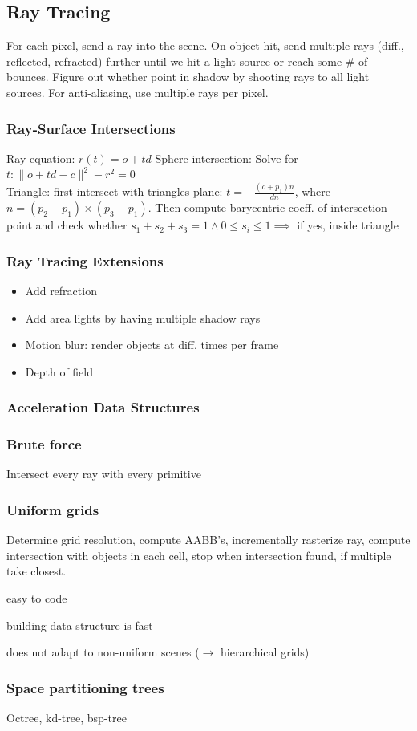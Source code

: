 \documentclass[a4paper,10pt]{article}
\let\svitem\item
\newenvironment{citemize}[1][\relax]{\renewcommand\item[1][black]{\color{##1}\svitem}
  \ifx\relax#1\itemize\else\itemize[#1]\fi}{\enditemize}
\newcommand*\good{\item[goodgreen]}
\newcommand*\bad{\item[badred]}
\begin{document}
\subsection{Ray Tracing}
For each pixel, send a ray into the scene. On object hit, send multiple rays (diff., reflected, refracted) further until we hit a light source or reach some \# of bounces. Figure out whether point in shadow by shooting rays to all light sources. For anti-aliasing, use multiple rays per pixel.

\subsubsection{Ray-Surface Intersections} Ray equation: \( r(t) = o + td \)
Sphere intersection: Solve for \( t: \lVert o + td - c \rVert ^2 - r^2 = 0 \) \\
Triangle: first intersect with triangles plane: \( t = -\frac{(o+p_{1})n}{dn} \), where \( n = (p_{2}-p_{1})\times(p_{3}-p_{1}) \).
Then compute barycentric coeff. of intersection point and check whether \( s_{1}+s_{2}+s_{3} = 1 \land 0 \le s_i \le 1 \implies \) if yes, inside triangle

\subsubsection{Ray Tracing Extensions}
\begin{itemize}
    \item Add refraction
    \item Add area lights by having multiple shadow rays
    \item Motion blur: render objects at diff. times per frame
    \item Depth of field
\end{itemize}

\subsubsection{Acceleration Data Structures}
\smallskip
\subsubsection{Brute force} Intersect every ray with every primitive
\subsubsection{Uniform grids} Determine grid resolution, compute AABB's, incrementally rasterize ray, compute intersection with objects in each cell, stop when intersection found, if multiple take closest.
\begin{citemize}
    \good easy to code
    \good building data structure is fast
    \bad does not adapt to non-uniform scenes (\( \to  \) hierarchical grids)
\end{citemize}
\subsubsection{Space partitioning trees} Octree, kd-tree, bsp-tree
\end{document}

